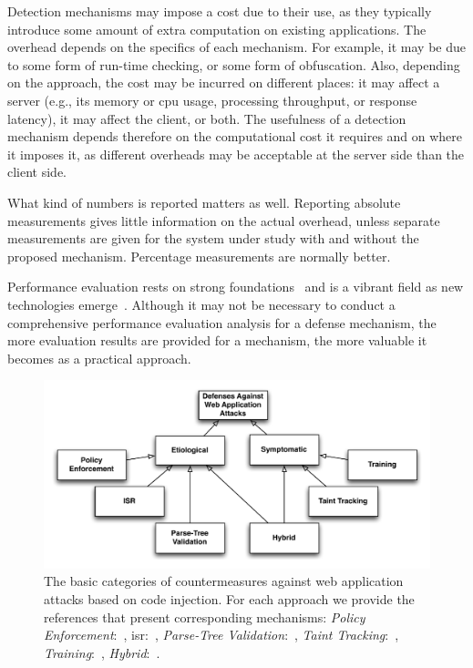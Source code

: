 \documentclass[10pt,journal,compsoc]{IEEEtran}
\begin{document}
Detection mechanisms may impose a cost due to their use, as they
typically introduce some amount of extra computation on existing applications.
The overhead depends on the specifics of each mechanism. For
example, it may be due to some form of run-time checking, or some form of
obfuscation. Also, depending on the approach, the cost may be incurred
on different places: it may affect a server
(e.g., its memory or {\sc cpu} usage, processing throughput, or response latency),
it may affect the client, or both. The
usefulness of a detection mechanism depends therefore on the
computational cost it requires and on where it imposes it, as
different overheads may be acceptable at the server side than the client side.

What kind of numbers is reported matters as well. Reporting absolute
measurements gives little information on the actual overhead, unless
separate measurements are given for the system under study with and
without the proposed mechanism. Percentage measurements are normally
better. 

Performance evaluation rests on strong foundations~\cite{jain1991} and
is a vibrant field as new technologies emerge~\cite{gregg2014}.
Although it may not be necessary to conduct a comprehensive
performance evaluation analysis for a defense mechanism, the more
evaluation results are provided for a mechanism, the more valuable
it becomes as a practical approach.

\begin{figure}[t]
\begin{center}
\leavevmode
\includegraphics[scale=0.60]{defenses.pdf}
\end{center}
\caption{\label{fig:defenses}The basic categories of countermeasures
against web application attacks based on code
injection. For each approach we provide the references
that present corresponding mechanisms:
{\it Policy Enforcement}:~\cite{NSS06,JKK06a,KKVJ06,KJKV09,TNH07,RDWDE07,YCIS07,OWVS08,PSC09,ML10,DDHPJ10,PS11,VDDPJ11,BV08,SSM10},
{\sc isr}:~\cite{BK04,JB07,GC09,APKLM10},
{\it Parse-Tree Validation}:~\cite{BWS05,SW06},
{\it Taint Tracking}:~\cite{HCF05,PB05,XBS06,NLC07,VFJKKV07,PMP11,SLMS14},
{\it Training}:~\cite{LLW02,HO05,HO06,HO05b,VMV05,JEP08,WPLKK09,MS09,MKS09,MKLS11},
{\it Hybrid}:~\cite{BV08,LV09,SMS13}.}
\end{figure}
\end{document}
